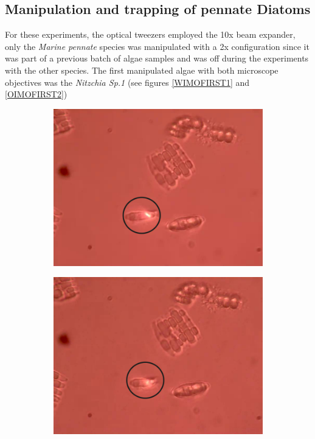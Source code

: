 \documentclass[letterpaper,12pt,oneside]{book}
\begin{document}
\subsection{Manipulation and trapping of pennate Diatoms}
For these experiments, the optical tweezers employed the 10x beam expander, only the \textit{Marine pennate} species was manipulated with a 2x configuration since it was part of a previous batch of algae samples and was off during the experiments with the other species. The first manipulated algae with both microscope objectives was the \textit{Nitzchia Sp.1} (see figures \ref{WIMOFIRST1} and \ref{OIMOFIRST2}) %
\begin{figure}[H] 
  \begin{subfigure}[b]{0.5\linewidth}
    \centering
    \includegraphics[scale=0.3]{ResultadosAlgea1/11.png} 
    \caption{}
    \label{fig7:a} 
    \vspace{4ex}
  \end{subfigure}%
  \begin{subfigure}[b]{0.5\linewidth}
    \centering
    \includegraphics[scale=0.3]{ResultadosAlgea1/levantando.png} 

\end{subfigure}
\end{figure}
\end{document}
